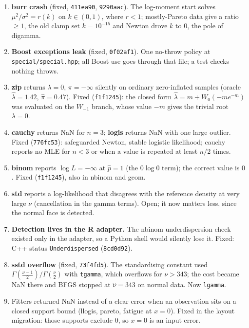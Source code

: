 \documentclass[11pt]{article}
\newcommand{\code}[1]{\texttt{#1}}
\theoremstyle{plain}
\theoremstyle{definition}
\theoremstyle{remark}
\begin{document}
\begin{enumerate}
  \item \textbf{burr crash} (fixed, \code{411ea90}, \code{9290aac}). The
    log-moment start solves $\mu^2/\sigma^2 = r(k)$ on $k \in (0,1)$, where
    $r < 1$; mostly-Pareto data give a ratio $\ge 1$, the old clamp set
    $k = 10^{-15}$ and Newton drove $k$ to $0$, the pole of digamma.
  \item \textbf{Boost exceptions leak} (fixed, \code{0f02af1}). One
    no-throw policy at \code{special/special.hpp}; all Boost use goes
    through that file; a test checks nothing throws.
  \item \textbf{zip} returns $\lambda = 0$, $\pi = -\infty$ silently on
    ordinary zero-inflated samples (oracle $\hat\lambda = 1.42$,
    $\hat\pi = 0.47$). Fixed (\code{f1f1245}): the closed form
    $\hat\lambda = m + W_0(-m e^{-m})$ was evaluated on the $W_{-1}$ branch,
    whose value $-m$ gives the trivial root $\lambda = 0$.
  \item \textbf{cauchy} returns NaN for $n = 3$; \textbf{logis} returns NaN
    with one large outlier. Fixed (\code{776fc53}): safeguarded Newton,
    stable logistic likelihood; cauchy reports no MLE for $n < 3$ or when a
    value is repeated at least $n/2$ times.
  \item \textbf{binom} reports $\log L = -\infty$ at $\hat p = 1$ (the
    $0\log 0$ term); the correct value is $0$. Fixed (\code{f1f1245}),
    also in nbinom and geom.
  \item \textbf{std} reports a log-likelihood that disagrees with the
    reference density at very large $\nu$ (cancellation in the gamma terms).
    Open; it now matters less, since the normal face is detected.
  \item \textbf{Detection lives in the R adapter.} The nbinom
    underdispersion check existed only in the adapter, so a Python shell
    would silently lose it. Fixed: C++ status \code{Underdispersed}
    (\code{8cd0d92}).
  \item \textbf{sstd overflow} (fixed, \code{73f4fd5}). The standardising
    constant used $\Gamma(\tfrac{\nu-1}{2})/\Gamma(\tfrac{\nu}{2})$ with
    \code{tgamma}, which overflows for $\nu > 343$; the cost became NaN there
    and BFGS stopped at $\hat\nu = 343$ on normal data. Now \code{lgamma}.
  \item Fitters returned NaN instead of a clear error when an observation sits
    on a closed support bound (llogis, pareto, fatigue at $x = 0$). Fixed in
    the layout migration: those supports exclude $0$, so $x = 0$ is an input
    error.
\end{enumerate}
\end{document}
